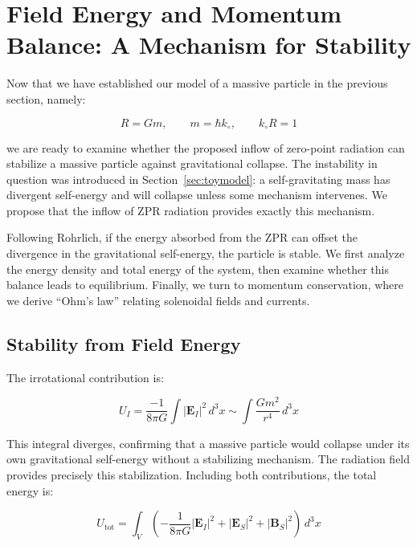 \documentclass {article}
\renewcommand\vec{\mathbf}
\begin{document}
\section{Field Energy and Momentum Balance: A Mechanism for Stability}
\label{sec:stability}

Now that we have established our model of a massive particle in the previous section, namely:

\begin{equation}
R = Gm, \qquad m = \hbar k_{\circ}, \qquad k_{\circ} R = 1
\end{equation}

\noindent we are ready to examine whether the proposed inflow of zero-point radiation can stabilize a massive particle against gravitational collapse. The instability in question was introduced in Section~\ref{sec:toymodel}: a self-gravitating mass has divergent self-energy and will collapse unless some mechanism intervenes. We propose that the inflow of ZPR radiation provides exactly this mechanism.

Following Rohrlich, if the energy absorbed from the ZPR can offset the divergence in the gravitational self-energy, the particle is stable. We first analyze the energy density and total energy of the system, then examine whether this balance leads to equilibrium. Finally, we turn to momentum conservation, where we derive ``Ohm's law'' relating solenoidal fields and currents.


\subsection{Stability from Field Energy}


The irrotational contribution is:

\begin{equation}
U_I = \frac{-1}{8\pi G} \int |\vec{E}_I|^2 \, d^3x \sim \int \frac{Gm^2}{r^4} \, d^3x
\end{equation}



This integral diverges, confirming that a massive particle would collapse under its own gravitational self-energy without a stabilizing mechanism. The radiation field provides precisely this stabilization. Including both contributions, the total energy is:

\begin{equation}
U_{\text{tot}} = \int_V \left( -\frac{1}{8\pi G} |\vec{E}_I|^2 + |\vec{E}_S|^2 + |\vec{B}_S|^2 \right) \, d^3x
\end{equation}
\end{document}
